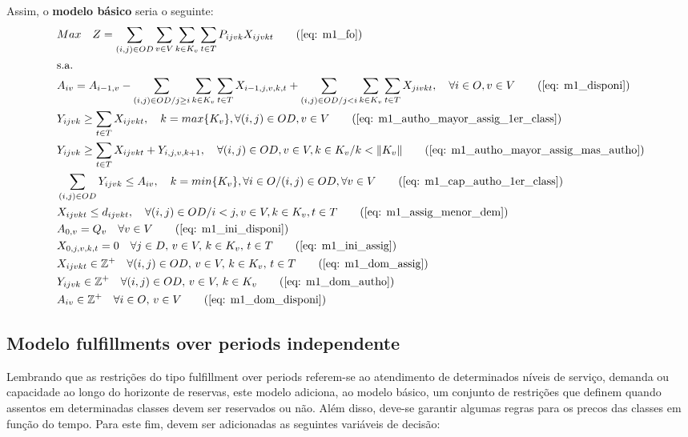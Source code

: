 Assim, o \textbf{modelo básico} seria o seguinte:
\allowdisplaybreaks
\begin{align}
	& Max \quad Z = \sum_{(i,j)\in OD} \sum_{v\in V} \sum_{k\in K_v} \sum_{t\in T} P_{ijvk} X_{ijvkt}     \tag{\ref{eq: m1_fo}}   \\
	& \text{s.a.}  \notag \\
	& A_{iv} = A_{i-1,v} - \sum_{(i,j) \in OD/j \geq i} \sum_{k\in K_v}\sum_{t\in T}X_{i-1,j,v,k,t} + \sum_{(i,j) \in OD/j<i} \sum_{k\in K_v}\sum_{t\in T}X_{jivkt}, \quad \forall i \in O, v \in V   \tag{\ref{eq: m1_disponi}} \\
	& Y_{ijvk} \geq  \sum_{t \in T} X_{ijvkt},  \quad k = max\{K_v\}, \forall(i,j) \in OD ,v \in V     \tag{\ref{eq: m1_autho_mayor_assig_1er_class}} \\
	& Y_{ijvk} \geq  \sum_{t \in T} X_{ijvkt} + Y_{i,j,v,k + 1} , \quad \forall(i,j) \in OD, v \in V, k \in K_v / k < \lVert K_v \rVert   \tag{\ref{eq: m1_autho_mayor_assig_mas_autho}} \\
	& \sum_{(i,j) \in OD} Y_{ijvk} \leq A_{iv}, \quad  k = min\{K_v\}, \forall i \in O / (i,j) \in OD,   \forall v \in V       \tag{\ref{eq: m1_cap_autho_1er_class}} \\
	& X_{ijvkt} \leq d_{ijvkt},  \quad \forall (i,j) \in OD / i < j  ,v \in V, k \in K_v, t\in T   \tag{\ref{eq: m1_assig_menor_dem}} \\
	& A_{0,v} = Q_v \quad \forall v \in V  \tag{\ref{eq: m1_ini_disponi}} \\ 
	& X_{0,j,v,k,t} = 0 \quad \forall j \in D,\, v \in V,\, k \in K_v,\, t \in T  \tag{\ref{eq: m1_ini_assig}} \\ 
	& X_{ijvkt} \in \mathbb{Z}^+ \quad \forall(i,j) \in OD,\, v \in V,\, k \in K_v,\, t \in T  \tag{\ref{eq: m1_dom_assig}} \\ 
	& Y_{ijvk} \in \mathbb{Z}^+ \quad \forall(i,j) \in OD,\, v \in V,\, k \in K_v  \tag{\ref{eq: m1_dom_autho}} \\ 
	& A_{iv} \in \mathbb{Z}^+ \quad \forall i \in O,\, v \in V  \tag{\ref{eq: m1_dom_disponi}} 
\end{align}

\subsection{Modelo fulfillments over periods independente}
Lembrando que as restrições do tipo fulfillment over periods referem-se ao atendimento de determinados níveis de serviço, demanda ou capacidade ao longo do horizonte de reservas, este modelo adiciona, ao modelo básico, um conjunto de restrições que definem quando assentos em determinadas classes devem ser reservados ou não. Além disso, 
deve-se garantir algumas regras para os precos das classes em função do tempo. Para este fim, devem ser adicionadas as seguintes variáveis de decisão:

